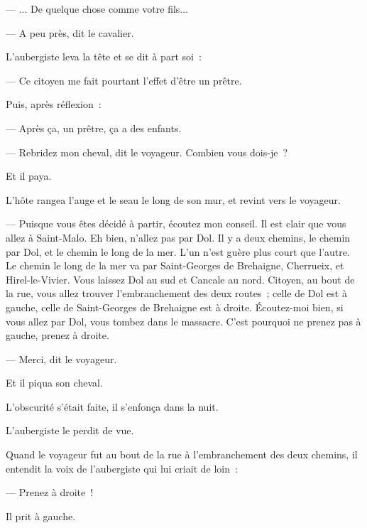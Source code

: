 \documentclass[french,twoside]{book} %
\begin{document}
— ... De quelque chose comme votre fils...\par
— A peu près, dit le cavalier.\par
L’aubergiste leva la tête et se dit à part soi :\par
— Ce citoyen me fait pourtant l’effet d’être un prêtre.\par
Puis, après réflexion :\par
 — Après ça, un prêtre, ça a des enfants.\par
— Rebridez mon cheval, dit le voyageur. Combien vous dois-je ?\par
Et il paya.\par
L’hôte rangea l’auge et le seau le long de son mur, et revint vers le voyageur.\par
— Puisque vous êtes décidé à partir, écoutez mon conseil. Il est clair que vous allez à Saint-Malo. Eh bien, n’allez pas par Dol. Il y a deux chemins, le chemin par Dol, et le chemin le long de la mer. L’un n’est guère plus court que l’autre. Le chemin le long de la mer va par Saint-Georges de Brehaigne, Cherrueix, et Hirel-le-Vivier. Vous laissez Dol au sud et Cancale au nord. Citoyen, au bout de la rue, vous allez trouver l’embranchement des deux routes ; celle de Dol est à gauche, celle de Saint-Georges de Brehaigne est à droite. Écoutez-moi bien, si vous allez par Dol, vous tombez dans le massacre. C’est pourquoi ne prenez pas à gauche, prenez à droite.\par
— Merci, dit le voyageur.\par
Et il piqua son cheval.\par
L’obscurité s’était faite, il s’enfonça dans la nuit.\par
L’aubergiste le perdit de vue.\par
Quand le voyageur fut au bout de la rue à l’embranchement des deux chemins, il entendit la voix de l’aubergiste qui lui criait de loin :\par
— Prenez à droite !\par
Il prit à gauche.
\end{document}
